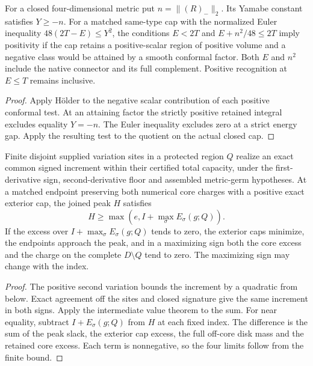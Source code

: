\begin{proposition}
\label{prop:ed46-scalar-cap}
\leanok
For a closed four-dimensional metric put $n=\|(R)_-\|_2$. Its Yamabe
constant satisfies $Y\ge -n$. For a matched same-type cap with the
normalized Euler inequality $48(2T-E)\le Y^2$, the conditions
$E<2T$ and $E+n^2/48\le2T$ imply positivity if the cap retains a
positive-scalar region of positive volume and a negative class would
be attained by a smooth conformal factor. Both $E$ and $n^2$ include
the native connector and its full complement. Positive recognition
at $E\le T$ remains inclusive.
\end{proposition}
\begin{proof}
\leanok
Apply H\"older to the negative scalar contribution of each positive
conformal test. At an attaining factor the strictly positive retained
integral excludes equality $Y=-n$. The Euler inequality excludes zero
at a strict energy gap. Apply the resulting test to the quotient on
the actual closed cap.
\end{proof}

\begin{proposition}
\label{prop:ed46-charged-core}
\leanok
Finite disjoint supplied variation sites in a protected region $Q$
realize an exact common signed increment within their certified total
capacity, under the first-derivative sign, second-derivative floor
and assembled metric-germ hypotheses. At a matched endpoint preserving
both numerical core charges with a positive exact exterior cap, the
joined peak $H$ satisfies
\[
 H\ge\max(e,I+\max_\sigma E_\sigma(g;Q)).
\]
If the excess over $I+\max_\sigma E_\sigma(g;Q)$ tends to zero, the
exterior caps minimize, the endpoints approach the peak, and in a
maximizing sign both the core excess and the charge on the complete
$D\setminus Q$ tend to zero. The maximizing sign may change with the index.
\end{proposition}
\begin{proof}
\leanok
The positive second variation bounds the increment by a quadratic from
below. Exact agreement off the sites and closed signature give the same
increment in both signs. Apply the intermediate value theorem to the
sum. For near equality, subtract $I+E_\sigma(g;Q)$ from $H$ at each
fixed index. The difference is the sum of the peak slack, the exterior
cap excess, the full off-core disk mass and the retained core excess.
Each term is nonnegative, so the four limits follow from the finite bound.
\end{proof}


